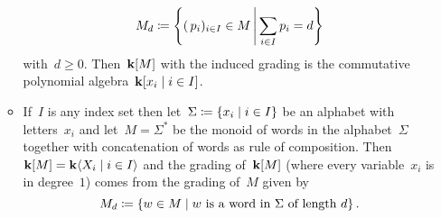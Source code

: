 \begin{examples}
\begin{enumerate}
\begin{itemize}
          \[
            M_d
            \defined
            \left\{
              (\spacing p_i)_{i \in I} \in M
            \suchthat*
              \sum_{i \in I} p_i = d
            \right\}
          \]
          with~$d \geq 0$.
          Then~$\mathbf{k}[M]$ with the induced grading is the commutative polynomial algebra~$\kf[x_i \suchthat i \in I]$.
        \item
          If~$I$ is any index set then let~$\Sigma \defined \{x_i \suchthat i \in I\}$ be an alphabet with letters~$x_i$ and let~$M = \Sigma^*$ be the monoid of words in the alphabet~$\Sigma$ together with concatenation of words as rule of composition.
          Then~$\kf[M] = \kf\gen{X_i \suchthat i \in I}$ and the grading of~$\mathbf{k}[M]$ (where every variable~$x_i$ is in degree~$1$) comes from the grading of~$M$ given by
          \[
            M_d
            \defined
            \{
              w \in M
            \suchthat
              \text{$w$ is a word in~$\Sigma$ of length~$d$}
            \}  \,.
          \]
      \end{itemize}
  \end{enumerate}
\end{examples}


